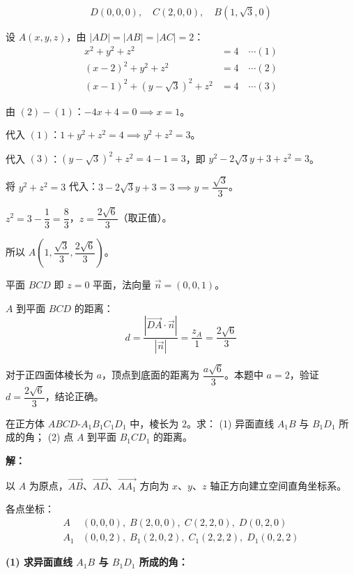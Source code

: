 \documentclass[12pt, a4paper]{ctexart}
\begin{document}
\[
D(0,0,0),\quad C(2,0,0),\quad B(1,\sqrt{3},0)
\]

设 $A(x,y,z)$，由 $|AD|=|AB|=|AC|=2$：
\begin{align*}
x^2+y^2+z^2&=4 \quad\cdots(1)\\
(x-2)^2+y^2+z^2&=4 \quad\cdots(2)\\
(x-1)^2+(y-\sqrt{3})^2+z^2&=4 \quad\cdots(3)
\end{align*}

由 $(2)-(1)$：$-4x+4=0\implies x=1$。

代入 $(1)$：$1+y^2+z^2=4\implies y^2+z^2=3$。

代入 $(3)$：$(y-\sqrt{3})^2+z^2=4-1=3$，即 $y^2-2\sqrt{3}y+3+z^2=3$。

将 $y^2+z^2=3$ 代入：$3-2\sqrt{3}y+3=3\implies y=\dfrac{\sqrt{3}}{3}$。

$z^2=3-\dfrac{1}{3}=\dfrac{8}{3}$，$z=\dfrac{2\sqrt{6}}{3}$（取正值）。

所以 $A\!\left(1,\dfrac{\sqrt{3}}{3},\dfrac{2\sqrt{6}}{3}\right)$。

平面 $BCD$ 即 $z=0$ 平面，法向量 $\vec{n}=(0,0,1)$。

$A$ 到平面 $BCD$ 的距离：
\[
d=\frac{|\overrightarrow{DA}\cdot\vec{n}|}{|\vec{n}|}=\frac{z_A}{1}=\frac{2\sqrt{6}}{3}
\]

\begin{tipbox}[方法总结]
对于正四面体棱长为 $a$，顶点到底面的距离为 $\dfrac{a\sqrt{6}}{3}$。本题中 $a=2$，验证 $d=\dfrac{2\sqrt{6}}{3}$，结论正确。
\end{tipbox}

\begin{examplebox}
在正方体 $ABCD$-$A_1B_1C_1D_1$ 中，棱长为 $2$。求：
(1) 异面直线 $A_1B$ 与 $B_1D_1$ 所成的角；
(2) 点 $A$ 到平面 $B_1CD_1$ 的距离。
\end{examplebox}

\textbf{解：}

以 $A$ 为原点，$\overrightarrow{AB}$、$\overrightarrow{AD}$、$\overrightarrow{AA_1}$ 方向为 $x$、$y$、$z$ 轴正方向建立空间直角坐标系。

各点坐标：
\begin{align*}
A&(0,0,0),\;B(2,0,0),\;C(2,2,0),\;D(0,2,0)\\
A_1&(0,0,2),\;B_1(2,0,2),\;C_1(2,2,2),\;D_1(0,2,2)
\end{align*}

\textbf{(1) 求异面直线 $A_1B$ 与 $B_1D_1$ 所成的角：}
\end{document}
